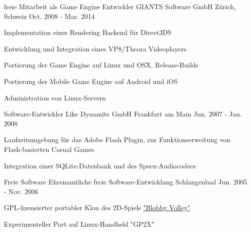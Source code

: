 \begin{cventries}
  \cventry
    {freie Mitarbeit als Game Engine Entwickler} %
    {GIANTS Software GmbH} %
    {Zürich, Schweiz} %
    {Oct. 2008 - Mar. 2014} %
    {
      \begin{cvitems} %
        \item {Implementation eines Rendering Backend für Direct3D9}
        \item {Entwicklung und Integration eines VP8/Theora Videoplayers}
        \item {Portierung der Game Engine auf Linux und OSX, Release-Builds}
        \item {Portierung der Mobile Game Engine auf Android und iOS}
        \item {Administration von Linux-Servern}
      \end{cvitems}
    }

  \cventry
    {Software-Entwickler} %
    {Like Dynamite GmbH} %
    {Frankfurt am Main} %
    {Jun. 2007 - Jan. 2008} %
    {
      \begin{cvitems} %
        \item {Laufzeitumgebung für das Adobe Flash Plugin, zur Funktionserweitung von Flash-basierten Casual Games}
        \item {Integration einer SQLite-Datenbank und des Speex-Audiocodecs}
      \end{cvitems}
    }

    \cventry
    {Freie Software} %
    {Ehrenamtliche freie Software-Entwicklung} %
    {Schlangenbad} %
    {Jun. 2005 - Nov. 2006} %
    {
      \begin{cvitems} %
        \item {GPL-lizensierter portabler Klon des 2D-Spiels \href{https://de.wikipedia.org/wiki/Blobby_Volley\#Blobby_Volley_2}{"Blobby Volley"} \acvHeaderIconSep \faWikipediaW}
        \item {Experimenteller Port auf Linux-Handheld "GP2X"}
      \end{cvitems}
    }

\end{cventries}
